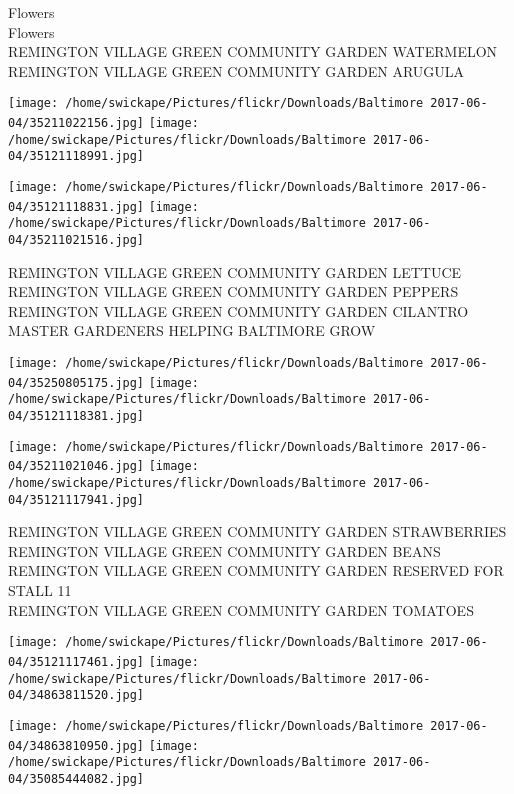 \documentclass[10pt,letterpaper]{article}
\begin{document}
Flowers\\
Flowers\\
REMINGTON VILLAGE GREEN COMMUNITY GARDEN WATERMELON\\
REMINGTON VILLAGE GREEN COMMUNITY GARDEN ARUGULA\\
\pagebreak

\texttt{[image: /home/swickape/Pictures/flickr/Downloads/Baltimore 2017-06-04/35211022156.jpg]}
\texttt{[image: /home/swickape/Pictures/flickr/Downloads/Baltimore 2017-06-04/35121118991.jpg]}

\texttt{[image: /home/swickape/Pictures/flickr/Downloads/Baltimore 2017-06-04/35121118831.jpg]}
\texttt{[image: /home/swickape/Pictures/flickr/Downloads/Baltimore 2017-06-04/35211021516.jpg]}

REMINGTON VILLAGE GREEN COMMUNITY GARDEN LETTUCE\\
REMINGTON VILLAGE GREEN COMMUNITY GARDEN PEPPERS\\
REMINGTON VILLAGE GREEN COMMUNITY GARDEN CILANTRO\\
MASTER GARDENERS HELPING BALTIMORE GROW\\
\pagebreak

\texttt{[image: /home/swickape/Pictures/flickr/Downloads/Baltimore 2017-06-04/35250805175.jpg]}
\texttt{[image: /home/swickape/Pictures/flickr/Downloads/Baltimore 2017-06-04/35121118381.jpg]}

\texttt{[image: /home/swickape/Pictures/flickr/Downloads/Baltimore 2017-06-04/35211021046.jpg]}
\texttt{[image: /home/swickape/Pictures/flickr/Downloads/Baltimore 2017-06-04/35121117941.jpg]}

REMINGTON VILLAGE GREEN COMMUNITY GARDEN STRAWBERRIES\\
REMINGTON VILLAGE GREEN COMMUNITY GARDEN BEANS\\
REMINGTON VILLAGE GREEN COMMUNITY GARDEN RESERVED FOR STALL 11\\
REMINGTON VILLAGE GREEN COMMUNITY GARDEN TOMATOES\\
\pagebreak

\texttt{[image: /home/swickape/Pictures/flickr/Downloads/Baltimore 2017-06-04/35121117461.jpg]}
\texttt{[image: /home/swickape/Pictures/flickr/Downloads/Baltimore 2017-06-04/34863811520.jpg]}

\texttt{[image: /home/swickape/Pictures/flickr/Downloads/Baltimore 2017-06-04/34863810950.jpg]}
\texttt{[image: /home/swickape/Pictures/flickr/Downloads/Baltimore 2017-06-04/35085444082.jpg]}
\end{document}
